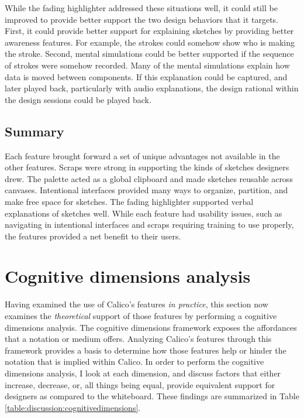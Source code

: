 While the fading highlighter addressed these situations well, it could still be improved to provide better support the two design behaviors that it targets. First, it could provide better support for explaining sketches by providing better awareness features. For example, the strokes could somehow show who is making the stroke. Second, mental simulations could be better supported if the sequence of strokes were somehow recorded. Many of the mental simulations explain how data is moved between components. If this explanation could be captured, and later played back, particularly with audio explanations, the design rational within the design sessions could be played back.

\subsection{Summary}

Each feature brought forward a set of unique advantages not available in the other features. Scraps were strong in supporting the kinds of sketches designers drew. The palette acted as a global clipboard and made sketches reusable across canvases. Intentional interfaces provided many ways to organize, partition, and make free space for sketches. The fading highlighter supported verbal explanations of sketches well. While each feature had usability issues, such as navigating in intentional interfaces and scraps requiring training to use properly, the features provided a net benefit to their users.

\section{Cognitive dimensions analysis}
\label{discussion:cog-dim}

Having examined the use of Calico's features \textit{in practice}, this section now examines the \textit{theoretical} support of those features by performing a cognitive dimensions analysis. The cognitive dimensions framework exposes the affordances that a notation or medium offers. Analyzing Calico's features through this framework provides a basis to determine how those features help or hinder the notation that is implied within Calico. In order to perform the cognitive dimensions analysis, I look at each dimension, and discuss factors that either increase, decrease, or, all things being equal, provide equivalent support for designers as compared to the whiteboard. These findings are summarized in Table \ref{table:discussion:cognitivedimensions}.

